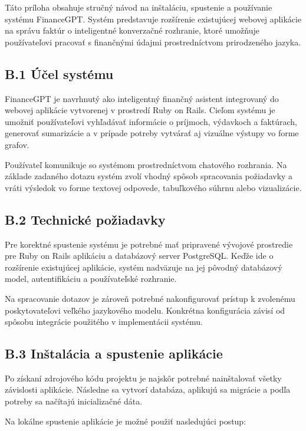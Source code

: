 Táto príloha obsahuje stručný návod na inštaláciu, spustenie a používanie systému
FinanceGPT. Systém predstavuje rozšírenie existujúcej webovej aplikácie na
správu faktúr o inteligentné konverzačné rozhranie, ktoré umožňuje používateľovi pracovať
s finančnými údajmi prostredníctvom prirodzeného jazyka.

\subsection*{B.1 Účel systému}

FinanceGPT je navrhnutý ako inteligentný finančný asistent integrovaný do
webovej aplikácie vytvorenej v prostredí Ruby on Rails. Cieľom systému je umožniť
používateľovi vyhľadávať informácie o príjmoch, výdavkoch a faktúrach, generovať sumarizácie
a v prípade potreby vytvárať aj vizuálne výstupy vo forme grafov.

Používateľ komunikuje so systémom prostredníctvom chatového rozhrania. Na
základe zadaného dotazu systém zvolí vhodný spôsob spracovania požiadavky a
vráti výsledok vo forme textovej odpovede, tabuľkového súhrnu alebo vizualizácie.

\subsection*{B.2 Technické požiadavky}

Pre korektné spustenie systému je potrebné mať pripravené vývojové prostredie
pre Ruby on Rails aplikáciu a databázový server PostgreSQL. Keďže ide o rozšírenie
existujúcej aplikácie, systém nadväzuje na jej pôvodný databázový model, autentifikáciu
a používateľské rozhranie.

Na spracovanie dotazov je zároveň potrebné nakonfigurovať prístup k zvolenému poskytovateľovi
veľkého jazykového modelu. Konkrétna konfigurácia závisí od spôsobu integrácie
použitého v implementácii systému.

\subsection*{B.3 Inštalácia a spustenie aplikácie}

Po získaní zdrojového kódu projektu je najskôr potrebné nainštalovať všetky závislosti
aplikácie. Následne sa vytvorí databáza, aplikujú sa migrácie a podľa potreby sa načítajú
inicializačné dáta.

Na lokálne spustenie aplikácie je možné použiť nasledujúci postup:

